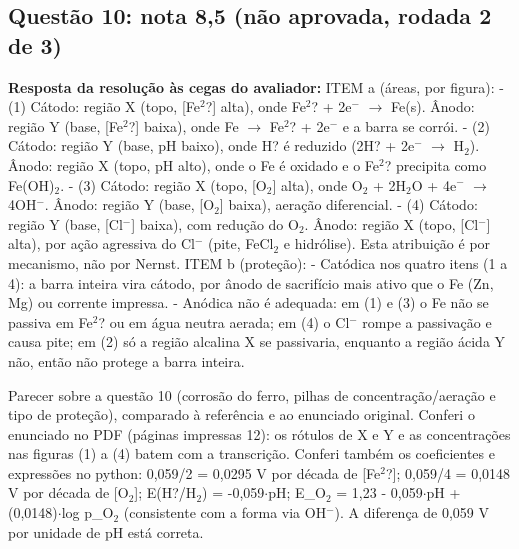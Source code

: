 \documentclass{article}%
\begin{document}
\subsection*{Questão 10: nota 8,5 (não aprovada, rodada 2 de 3)}%
\textbf{Resposta da resolução às cegas do avaliador:} ITEM a (áreas, por figura):\newline%
{-} (1) Cátodo: região X (topo, {[}Fe$^2$?{]} alta), onde Fe$^2$? + 2e$^{-}$ $\to$ Fe(s). Ânodo: região Y (base, {[}Fe$^2$?{]} baixa), onde Fe $\to$ Fe$^2$? + 2e$^{-}$ e a barra se corrói.\newline%
{-} (2) Cátodo: região Y (base, pH baixo), onde H? é reduzido (2H? + 2e$^{-}$ $\to$ H$_{2}$). Ânodo: região X (topo, pH alto), onde o Fe é oxidado e o Fe$^2$? precipita como Fe(OH)$_{2}$.\newline%
{-} (3) Cátodo: região X (topo, {[}O$_{2}${]} alta), onde O$_{2}$ + 2H$_{2}$O + 4e$^{-}$ $\to$ 4OH$^{-}$. Ânodo: região Y (base, {[}O$_{2}${]} baixa), aeração diferencial.\newline%
{-} (4) Cátodo: região Y (base, {[}Cl$^{-}${]} baixa), com redução do O$_{2}$. Ânodo: região X (topo, {[}Cl$^{-}${]} alta), por ação agressiva do Cl$^{-}$ (pite, FeCl$_{2}$ e hidrólise). Esta atribuição é por mecanismo, não por Nernst.\newline%
\newline%
ITEM b (proteção):\newline%
{-} Catódica nos quatro itens (1 a 4): a barra inteira vira cátodo, por ânodo de sacrifício mais ativo que o Fe (Zn, Mg) ou corrente impressa.\newline%
{-} Anódica não é adequada: em (1) e (3) o Fe não se passiva em Fe$^2$? ou em água neutra aerada; em (4) o Cl$^{-}$ rompe a passivação e causa pite; em (2) só a região alcalina X se passivaria, enquanto a região ácida Y não, então não protege a barra inteira.\par %
Parecer sobre a questão 10 (corrosão do ferro, pilhas de concentração/aeração e tipo de proteção), comparado à referência e ao enunciado original.\newline%
\newline%
Conferi o enunciado no PDF (páginas impressas 12): os rótulos de X e Y e as concentrações nas figuras (1) a (4) batem com a transcrição. Conferi também os coeficientes e expressões no python: 0,059/2 = 0,0295 V por década de {[}Fe$^2$?{]}; 0,059/4 = 0,0148 V por década de {[}O$_{2}${]}; E(H?/H$_{2}$) = -0,059$\cdot$pH; E\_O$_{2}$ = 1,23 - 0,059$\cdot$pH + (0,0148)$\cdot$log p\_O$_{2}$ (consistente com a forma via OH$^{-}$). A diferença de 0,059 V por unidade de pH está correta.\newline%
\end{document}
